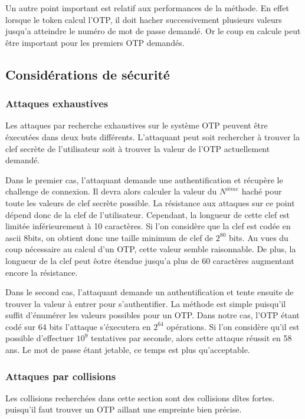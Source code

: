 \documentclass{../res/univ-projet}
\begin{document}
  Un autre point important est relatif aux performances de la méthode. En effet
  lorsque le token calcul l'OTP, il doit hacher successivement plusieurs 
  valeurs jusqu'a atteindre le numéro de mot de passe demandé. Or le coup en 
  calcule peut être important pour les premiers OTP demandés.
  
  \subsection{Considérations de sécurité}
    \subsubsection{Attaques exhaustives}
    Les attaques par recherche exhaustives sur le système OTP peuvent être 
    éxecutées dans deux buts différents. L'attaquant peut soit rechercher à
    trouver la clef secrète de l'utilisateur soit à trouver la valeur de l'OTP
    actuellement demandé.
    
    Dans le premier cas, l'attaquant demande une authentification et récupère 
    le challenge de connexion. Il devra alors calculer la valeur du $N^{ième}$ 
    haché pour toute les valeurs de clef secrète possible. La résistance aux
    attaques sur ce point dépend donc de la clef de l'utilisateur. Cependant, 
    la longueur de cette clef est limitée inférieurement à 10 caractères. Si
    l'on considère que la clef est codée en ascii 8bits, on obtient donc une 
    taille minimum de clef de $2^{80}$ bits. Au vues du coup nécessaire au 
    calcul d'un OTP, cette valeur semble raisonnable. De plus, la longueur de 
    la clef peut êotre étendue jusqu'a plus de 60 caractères augmentant encore
    la résistance.
    
    Dans le second cas, l'attaquant demande un authentification et tente 
    ensuite de trouver la valeur à entrer pour s'authentifier. La méthode est
    simple puisqu'il suffit d'énumérer les valeurs possibles pour un OTP. Dans
    notre cas, l'OTP étant codé sur 64 bits l'attaque s'éxecutera en $2^{64}$ 
    opérations. Si l'on considère qu'il est possible d'effectuer $10^9$ 
    tentatives par seconde, alors cette attaque réussit en 58 ans. Le mot de 
    passe étant jetable, ce temps est plus qu'acceptable.
    
    \subsubsection{Attaques par collisions}
        Les collisions recherchées dans cette section sont des collisions dîtes fortes.
    puisqu'il faut trouver un OTP aillant une empreinte bien précise.
    
\end{document}

